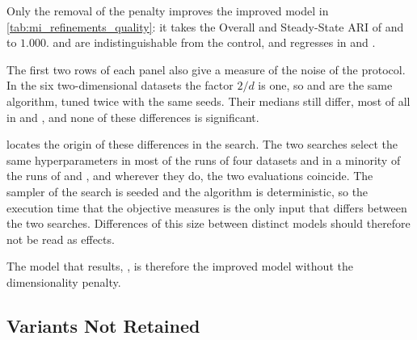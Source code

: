 

Only the removal of the penalty improves the improved model in \cref{tab:mi_refinements_quality}: it takes the Overall and Steady-State ARI of  and  to $1.000$.  and  are indistinguishable from the control, and  regresses in \ChameleonDSThree and \ChameleonDSFour.

The first two rows of each panel also give a measure of the noise of the protocol. In the six two-dimensional datasets the factor $2/d$ is one, so  and  are the same algorithm, tuned twice with the same seeds. Their medians still differ, most of all in \BenchmarkOne and \BenchmarkTwo, and none of these differences is significant.



 locates the origin of these differences in the search. The two searches select the same hyperparameters in most of the runs of four datasets and in a minority of the runs of \BenchmarkOne and \BenchmarkTwo, and wherever they do, the two evaluations coincide. The sampler of the search is seeded and the algorithm is deterministic, so the execution time that the objective measures is the only input that differs between the two searches. Differences of this size between distinct models should therefore not be read as effects.

The model that results, \MicroTEDAClusPlus, is therefore the improved model without the dimensionality penalty.

\subsection{Variants Not Retained}
\label{subsec:mi_not_retained}

